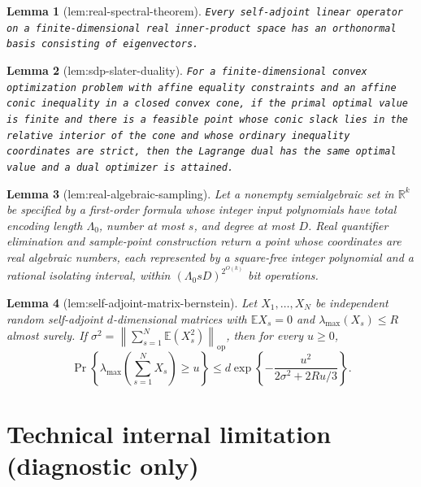 \documentclass{article}
\newtheorem{lemma}{Lemma}
\begin{document}
\begin{lemma}[lem:real-spectral-theorem]\label{lem:real-spectral-theorem}
\texttt{Every self-\allowbreak{}adjoint linear operator on a finite-\allowbreak{}dimensional real inner-\allowbreak{}product space has an orthonormal basis consisting of eigenvectors.}
\end{lemma}

\begin{lemma}[lem:sdp-slater-duality]\label{lem:sdp-slater-duality}
\texttt{For a finite-\allowbreak{}dimensional convex optimization problem with affine equality constraints and an affine conic inequality in a closed convex cone,\allowbreak{} if the primal optimal value is finite and there is a feasible point whose conic slack lies in the relative interior of the cone and whose ordinary inequality coordinates are strict,\allowbreak{} then the Lagrange dual has the same optimal value and a dual optimizer is attained.}
\end{lemma}

\begin{lemma}[lem:real-algebraic-sampling]\label{lem:real-algebraic-sampling}
Let a nonempty semialgebraic set in \(\mathbb R^k\) be specified by a first-order formula whose integer input polynomials have total encoding length \(\Lambda_0\), number at most \(s\), and degree at most \(D\).  Real quantifier elimination and sample-point construction return a point whose coordinates are real algebraic numbers, each represented by a square-free integer polynomial and a rational isolating interval, within \((\Lambda_0sD)^{2^{O(k)}}\) bit operations.
\end{lemma}

\begin{lemma}[lem:self-adjoint-matrix-bernstein]\label{lem:self-adjoint-matrix-bernstein}
Let \(X_1,\ldots,X_N\) be independent random self-adjoint \(d\)-dimensional matrices with \(\mathbb E X_s=0\) and \(\lambda_{\max}(X_s)\le R\) almost surely.  If \(\sigma^2=\left\|\sum_{s=1}^N\mathbb E(X_s^2)\right\|_{\mathrm{op}}\), then for every \(u\ge0\),
\[
 \Pr\!\left\{\lambda_{\max}\!\left(\sum_{s=1}^NX_s\right)\ge u\right\}
 \le d\exp\!\left\{-\frac{u^2}{2\sigma^2+2Ru/3}\right\}.
\]
\end{lemma}

\section*{Technical internal limitation (diagnostic only)}
\end{document}
